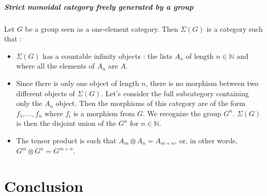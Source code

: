 \documentclass{report}
\begin{document}
\paragraph{Strict monoidal category freely generated by a group}



Let $G$ be a group seen as a one-element category. Then $ \Sigma(G)$ is a category such that : 
\begin{itemize}
    \item $\Sigma(G)$ has a countable infinity objects : the lists $A_n$ of length $n \in \mathbb{N}$ and where all the elements of $A_n$ are $A$.
    \item Since there is only one object of length $n$, there is no morphism between two different objects of $\Sigma(G)$. Let's consider the full subcategory containing only the $A_n$ object. Then the morphisms of this category are of the form $f_1,...,f_n$ where $f_i$ is a morphism from $G$. We recognize the group $G^{n}$. $\Sigma (G)$ is then the disjoint union of the $G^{n}$ for $ n\in\mathbb{N}$.
    \item  The tensor product is such that  $A_m \otimes A_n = A_{m+n}$, or, in other words, $G^m \otimes G^n = G^{m+n}$. 
\end{itemize}



\chapter{Conclusion}

\newpage



\end{document}
